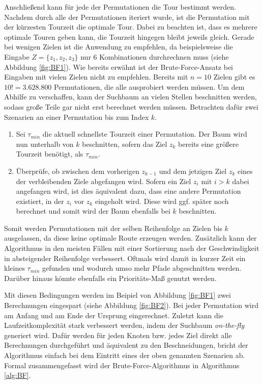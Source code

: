 \documentclass[german,version-2019-11]{uzl-thesis}
\begin{document}
Anschließend kann für jede der Permutationen die Tour bestimmt werden. Nachdem durch alle der Permutationen iteriert wurde, ist die Permutation mit der kürzesten Tourzeit die optimale Tour. Dabei zu beachten ist, dass es mehrere optimale Touren geben kann, die Tourzeit hingegen bleibt jeweils gleich. Gerade bei wenigen Zielen ist die Anwendung zu empfehlen, da beispielsweise die Eingabe $Z=\{z_1, z_2, z_3\}$ nur 6 Kombinationen durchrechnen muss (siehe Abbildung \ref{fig:BF1}). Wie bereits erwähnt ist der Brute-Force-Ansatz bei Eingaben mit vielen Zielen nicht zu empfehlen. Bereits mit $n=10$ Zielen gibt es $10! = 3.628.800$ Permutationen, die alle ausprobiert werden müssen. Um dem Abhilfe zu verschaffen, kann der Suchbaum an vielen Stellen beschnitten werden, sodass große Teile gar nicht erst berechnet werden müssen. Betrachten dafür zwei Szenarien an einer Permutation bis zum Index $k$.
\begin{enumerate}
\item
Sei $\tau_{min}$ die aktuell schnellste Tourzeit einer Permutation. Der Baum wird nun unterhalb von $k$ beschnitten, sofern das Ziel $z_k$ bereits eine größere Tourzeit benötigt, als $\tau_{min}$. 

\item
Überprüfe, ob zwischen dem vorherigen $z_{k-1}$ und dem jetzigen Ziel $z_{k}$ eines der verbleibenden Ziele abgefangen wird. Sofern ein Ziel $z_{i} \text{ mit } i>k$ dabei angefangen wird, ist dies äquivalent dazu, dass eine andere Permutation existiert, in der $z_i$ vor $z_k$ eingeholt wird. Diese wird ggf. später noch berechnet und somit wird der Baum ebenfalls bei $k$ beschnitten.
\end{enumerate} 
Somit werden Permutationen mit der selben Reihenfolge an Zielen bis $k$ ausgelassen, da diese keine optimale Route erzeugen werden. Zusätzlich kann der Algorithmus in den meisten Fällen mit einer Sortierung nach der Geschwindigkeit in absteigender Reihenfolge verbessert. Oftmals wird damit in kurzer Zeit ein kleines $\tau_{min}$ gefunden und wodurch umso mehr Pfade abgeschnitten werden. Darüber hinaus könnte ebenfalls ein Prioritäts-Maß genutzt werden. 

Mit diesen Bedingungen werden im Beipiel von Abbildung \ref{fig:BF1} zwei Berechnungen eingespart (siehe Abbildung \ref{fig:BF2}). Bei jeder Permutation wird am Anfang und am Ende der Ursprung eingerechnet. Zuletzt kann die Laufzeitkomplexität stark verbessert werden, indem der Suchbaum \emph{on-the-fly} generiert wird. Dafür werden für jeden Knoten bzw. jedes Ziel direkt alle Berechnungen durchgeführt und äquivalent zu den Beschneidungen, bricht der Algorithmus einfach bei dem Eintritt eines der oben genannten Szenarien ab. Formal zusammengefasst wird der Brute-Force-Algorithmus in Algorithmus \ref{alg:BF}. \\
\end{document}
